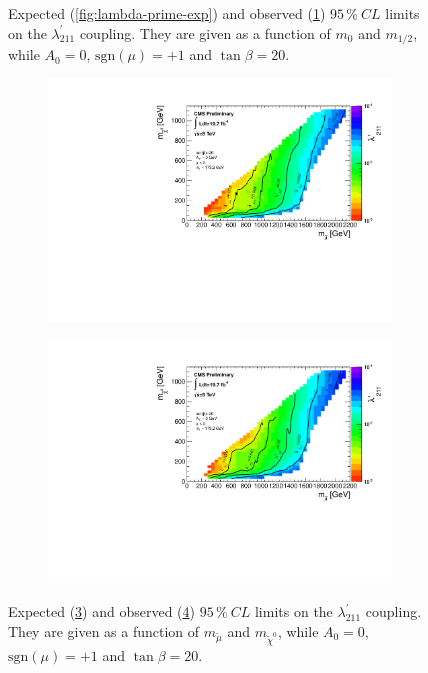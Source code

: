 \begin{figure}[!htbp]
\begin{subfigure}[b]{0.85\textwidth}
    \caption{\label{fig:lambda-prime-obs}}
  \end{subfigure}
  \caption{Expected (\ref{fig:lambda-prime-exp}) and observed (\ref{fig:lambda-prime-obs}) $95\,\%\: CL$ limits on the $\lambda^{\prime}_{211}$ coupling. They are given as a function of $m_0$ and $m_{1/2}$, while $A_0 = 0$, $\text{sgn}(\mu) = +1$ and $\tan{\beta} = 20$.}
  \label{fig:lambda-prime-limits}
\end{figure}

\begin{figure}[!htbp]
  \centering
  \begin{subfigure}[b]{0.90\textwidth}
    \centering
    \includegraphics[width=\textwidth]{plots/plot_smuon_neutralino_mass_expectedLimitsCombine.pdf}
    \caption{\label{fig:m-smu-nt0-exp}}
  \end{subfigure}
  \begin{subfigure}[b]{0.90\textwidth}
    \centering
    \includegraphics[width=\textwidth]{plots/plot_smuon_neutralino_mass_LimitsCombine.pdf}
    \caption{\label{fig:m-smu-nt0-obs}}
  \end{subfigure}
  \caption{Expected (\ref{fig:m-smu-nt0-exp}) and observed (\ref{fig:m-smu-nt0-obs}) $95\,\%\: CL$ limits on the $\lambda^{\prime}_{211}$ coupling. They are given as a function of $m_{\tilde{\mu}}$ and $m_{\tilde{\chi}^0}$, while $A_0 = 0$, $\text{sgn}(\mu) = +1$ and $\tan{\beta} = 20$.}
  \label{fig:smu-nt0-limits}
\end{figure}


